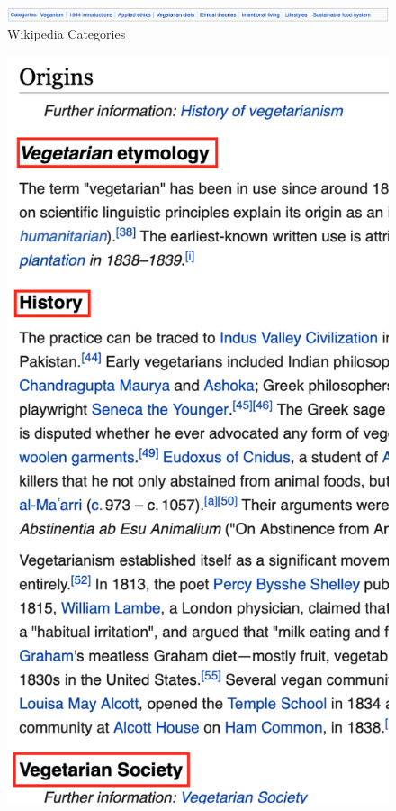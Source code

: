 \documentclass[a4paper]{article}
\begin{document}
\begin{figure}[H]
	\includegraphics[scale=0.5]{imgs/categories}
	\caption{Wikipedia Categories}
	\label{fig:categories}
\end{figure}

\begin{figure}[H]
  \begin{minipage}[b]{0.4\textwidth}
    \includegraphics[width=\textwidth]{imgs/topics}

\end{minipage}
\end{figure}
\end{document}
